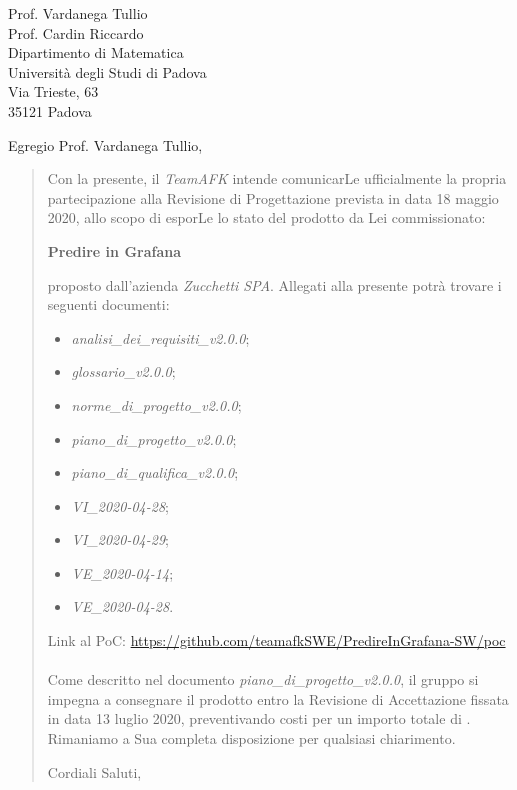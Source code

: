 \begin{letter}{
		Prof. Vardanega Tullio \\
		Prof. Cardin Riccardo \\
		Dipartimento di Matematica \\
		Università degli Studi di Padova \\
		Via Trieste, 63 \\
		35121 Padova}
		
\opening{Egregio Prof. Vardanega Tullio,}

\begin{quotation}
Con la presente, il \textit{TeamAFK} intende comunicarLe ufficialmente la propria partecipazione alla Revisione di Progettazione prevista in data 18 maggio 2020, allo scopo di esporLe lo stato del prodotto da Lei commissionato:

\begin{center}
	\textbf{Predire in Grafana}
\end{center}

\noindent proposto dall'azienda \textit{Zucchetti SPA}.
Allegati alla presente potrà trovare i seguenti documenti:
\begin{itemize}
	\item \textit{analisi\_dei\_requisiti\_v2.0.0};
	
	\item \textit{glossario\_v2.0.0};
	
	\item \textit{norme\_di\_progetto\_v2.0.0};

	\item \textit{piano\_di\_progetto\_v2.0.0};

	\item \textit{piano\_di\_qualifica\_v2.0.0};
	
	\item \textit{VI\_2020-04-28};
	\item \textit{VI\_2020-04-29};
	\item \textit{VE\_2020-04-14};
	\item \textit{VE\_2020-04-28}.
\end{itemize}
\noindent 
Link al PoC: \href{https://github.com/teamafkSWE/PredireInGrafana-SW/tree/master/poc} {https://github.com/teamafkSWE/PredireInGrafana-SW/poc}\\ \\
Come descritto nel documento \textit{piano\_di\_progetto\_v2.0.0}, il gruppo si impegna a consegnare il prodotto entro la Revisione di Accettazione fissata in data 13 luglio 2020, preventivando costi per un importo totale di \textbf{}.\\
Rimaniamo a Sua completa disposizione per qualsiasi chiarimento.

\vspace{0.5cm}
\closing{ Cordiali Saluti,}
	

\end{quotation}
		
\end{letter}